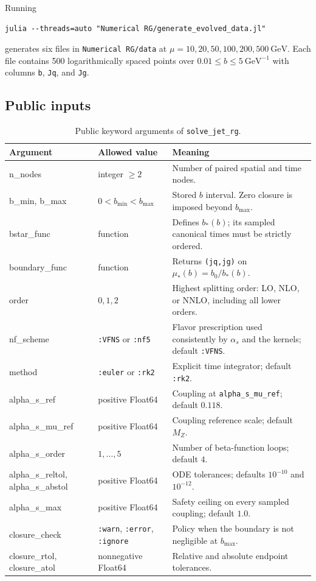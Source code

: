 \documentclass[11pt]{article}
\begin{document}
Running
\begin{lstlisting}
julia --threads=auto "Numerical RG/generate_evolved_data.jl"
\end{lstlisting}
generates six files in \texttt{Numerical RG/data} at
\(\mu=10,20,50,100,200,500~\mathrm{GeV}\). Each file contains 500
logarithmically spaced points over
\(0.01\le b\le5~\mathrm{GeV}^{-1}\) with columns
\texttt{b}, \texttt{Jq}, and \texttt{Jg}.

\subsection{Public inputs}

\begin{table}[H]
\centering
\caption{Public keyword arguments of \texttt{solve\_jet\_rg}.}
\label{tab:solver-inputs}
\begin{tabularx}{\textwidth}{@{}>{\ttfamily}l >{\raggedright\arraybackslash}p{} X@{}}
\toprule
\textrm{Argument} & \textrm{Allowed value} & \textrm{Meaning}\\
\midrule
n\_nodes
  & integer \(\ge2\)
  & Number of paired spatial and time nodes.\\
b\_min, b\_max
  & \(0<b_{\min}<b_{\max}\)
  & Stored \(b\) interval. Zero closure is imposed beyond \(b_{\max}\).\\
bstar\_func
  & function
  & Defines \(b_*(b)\); its sampled canonical times must be strictly ordered.\\
boundary\_func
  & function
  & Returns \texttt{(jq,jg)} on \(\mu_*(b)=b_0/b_*(b)\).\\
order
  & \(0,1,2\)
  & Highest splitting order: LO, NLO, or NNLO, including all lower orders.\\
nf\_scheme
  & \texttt{:VFNS} or \texttt{:nf5}
  & Flavor prescription used consistently by \(\alpha_s\) and the kernels;
    default \texttt{:VFNS}.\\
method
  & \texttt{:euler} or \texttt{:rk2}
  & Explicit time integrator; default \texttt{:rk2}.\\
alpha\_s\_ref
  & positive Float64
  & Coupling at \texttt{alpha\_s\_mu\_ref}; default \(0.118\).\\
alpha\_s\_mu\_ref
  & positive Float64
  & Coupling reference scale; default \(M_Z\).\\
alpha\_s\_order
  & \(1,\ldots,5\)
  & Number of beta-function loops; default \(4\).\\
alpha\_s\_reltol, alpha\_s\_abstol
  & positive Float64
  & ODE tolerances; defaults \(10^{-10}\) and \(10^{-12}\).\\
alpha\_s\_max
  & positive Float64
  & Safety ceiling on every sampled coupling; default \(1.0\).\\
closure\_check
  & \texttt{:warn}, \texttt{:error}, \texttt{:ignore}
  & Policy when the boundary is not negligible at \(b_{\max}\).\\
closure\_rtol, closure\_atol
  & nonnegative Float64
  & Relative and absolute endpoint tolerances.\\
\bottomrule
\end{tabularx}
\end{table}
\end{document}
